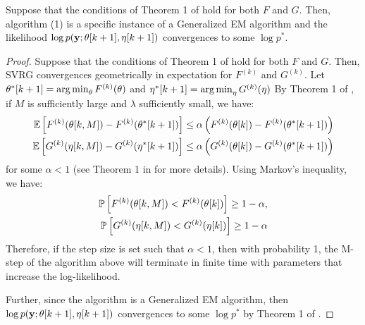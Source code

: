 \begin{lemma}
    Suppose that the conditions of Theorem 1 of \citet{Johnson:2013} hold for both $F$ and $G$. Then, algorithm (1) is a specific instance of a Generalized EM algorithm and the likelihood $\log p(\mathbf{y} ; \theta[k+1],\eta[k+1])$ convergences to some $\log p^*$.
\end{lemma}
%
\begin{proof}
Suppose that the conditions of Theorem 1 of \citet{Johnson:2013} hold for both $F$ and $G$. Then, SVRG convergences geometrically in expectation for $F^{(k)}$ and $G^{(k)}$. Let $\theta^*[k+1] = \operatorname*{arg\,min}_\theta F^{(k)}(\theta)$ and $\eta^*[k+1] = \operatorname*{arg\,min}_\eta G^{(k)}(\eta)$ By Theorem 1 of \citet{Johnson:2013}, if $M$ is sufficiently large and $\lambda$ sufficiently small, we have: 
%
\begin{align*}
    \mathbb{E}\left[F^{(k)}(\theta[k,M]) - F^{(k)}(\theta^*[k+1])\right] \leq \alpha \left(F^{(k)}(\theta[k]) - F^{(k)}(\theta^*[k+1])\right) \\
    \mathbb{E}\left[G^{(k)}(\eta[k,M]) - G^{(k)}(\eta^*[k+1])\right] \leq \alpha \left(G^{(k)}(\theta[k]) - G^{(k)}(\theta^*[k+1])\right)
\end{align*}
%
for some $\alpha < 1$ (see Theorem 1 in \citet{Johnson:2013} for more details). Using Markov's inequality, we have:
\begin{align*}
    \mathbb{P}\left[F^{(k)}(\theta[k,M]) < F^{(k)}(\theta[k])\right] \geq 1-\alpha, \\
    \mathbb{P}\left[G^{(k)}(\eta[k,M]) < G^{(k)}(\eta[k])\right] \geq 1-\alpha
\end{align*}
Therefore, if the step size is set such that $\alpha < 1$, then with probability 1, the M-step of the algorithm above will terminate in finite time with parameters that increase the log-likelihood.

Further, since the algorithm is a Generalized EM algorithm, then $\log p(\mathbf{y} ; \theta[k+1],\eta[k+1])$ convergences to some $\log p^*$ by Theorem 1 of \citep{Wu:1983}.
\end{proof}



